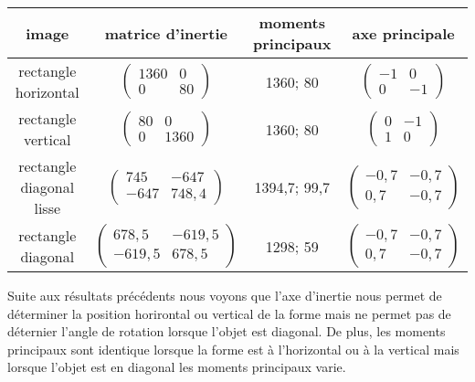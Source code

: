 \documentclass{article}
\begin{document}
  \begin{center}
    \begin{tabular}{|c|c|c|c|}
      \hline
      \textbf{image} & \textbf{matrice d'inertie} & \textbf{moments principaux} & \textbf{axe principale} \\
      \hline
      rectangle horizontal & $\begin{pmatrix}
			      1360 & 0 \\
			      0 & 80 
			      \end{pmatrix}$ 
			  & 1360; 80
			  &  $\begin{pmatrix}
			      -1 & 0 \\
			      0 & -1 
			      \end{pmatrix}$\\
      \hline
      rectangle vertical & $\begin{pmatrix}
			      80 & 0 \\
			      0 & 1360 
			      \end{pmatrix}$
			  & 1360; 80
			  &  $\begin{pmatrix}
			      0 & -1 \\
			      1 & 0 
			      \end{pmatrix}$\\
      \hline
      rectangle diagonal lisse & $\begin{pmatrix}
			      745 & -647 \\
			      -647 & 748,4 
			      \end{pmatrix}$
			  & 1394,7; 99,7
			  &  $\begin{pmatrix}
			      -0,7 & -0,7 \\
			      0,7 & -0,7 
			      \end{pmatrix}$\\
      \hline
      rectangle diagonal & $\begin{pmatrix}
			      678,5 & -619,5 \\
			      -619,5 & 678,5 
			      \end{pmatrix}$
			  & 1298; 59
			  &  $\begin{pmatrix}
			      -0,7 & -0,7 \\
			      0,7 & -0,7 
			      \end{pmatrix}$\\
      \hline
    \end{tabular}
  \end{center}
  
  Suite aux résultats précédents nous voyons que l'axe d'inertie nous permet de déterminer la position horirontal
  ou vertical de la forme mais ne permet pas de déternier l'angle de rotation lorsque l'objet est diagonal.
  De plus, les moments principaux sont identique lorsque la forme est à l'horizontal ou à la vertical mais lorsque 
  l'objet est en diagonal les moments principaux varie.\\
  
\end{document}
